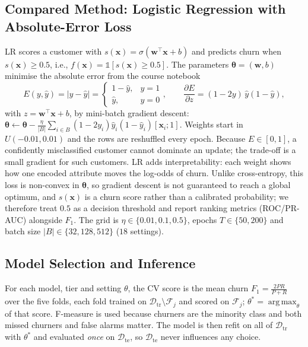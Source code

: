 \documentclass[sigconf,nonacm]{acmart}
\newcommand{\Dtr}{\mathcal{D}_{\mathrm{tr}}}
\newcommand{\Dte}{\mathcal{D}_{\mathrm{te}}}
\DeclareMathOperator*{\argmax}{arg\,max}
\begin{document}
\subsection{Compared Method: Logistic Regression with Absolute-Error Loss}
LR scores a customer with $s(\mathbf{x})=\sigma(\mathbf{w}^{\top}\mathbf{x}+b)$ and predicts churn when $s(\mathbf{x})\ge0.5$, i.e., $f(\mathbf{x})=\mathbb{1}[s(\mathbf{x})\ge0.5]$. The parameters $\boldsymbol\theta=(\mathbf{w},b)$ minimise the absolute error from the course notebook
\begin{equation*}
E(y,\hat y)=|y-\hat y|=\begin{cases}1-\hat y,&y=1\\ \hat y,&y=0\end{cases},\qquad \frac{\partial E}{\partial z}=(1-2y)\,\hat y(1-\hat y),
\end{equation*}
with $z=\mathbf{w}^{\top}\mathbf{x}+b$, by mini-batch gradient descent:
$\boldsymbol\theta\leftarrow\boldsymbol\theta-\frac{\eta}{|B|}\sum_{i\in B}(1-2y_i)\hat y_i(1-\hat y_i)[\mathbf{x}_i;1]$. Weights start in $U(-0.01,0.01)$ and the rows are reshuffled every epoch. Because $E\in[0,1]$, a confidently misclassified customer cannot dominate an update; the trade-off is a small gradient for such customers. LR adds interpretability: each weight shows how one encoded attribute moves the log-odds of churn. Unlike cross-entropy, this loss is non-convex in $\boldsymbol\theta$, so gradient descent is not guaranteed to reach a global optimum, and $s(\mathbf{x})$ is a churn score rather than a calibrated probability; we therefore treat $0.5$ as a decision threshold and report ranking metrics (ROC/PR-AUC) alongside $F_1$. The grid is $\eta\in\{0.01,0.1,0.5\}$, epochs $T\in\{50,200\}$ and batch size $|B|\in\{32,128,512\}$ ($18$ settings).

\subsection{Model Selection and Inference}
For each model, tier and setting $\theta$, the CV score is the mean churn $F_1=\frac{2PR}{P+R}$ over the five folds, each fold trained on $\Dtr\setminus\mathcal{F}_j$ and scored on $\mathcal{F}_j$; $\theta^*=\argmax_\theta$ of that score. F-measure is used because churners are the minority class and both missed churners and false alarms matter. The model is then refit on all of $\Dtr$ with $\theta^*$ and evaluated \emph{once} on $\Dte$, so $\Dte$ never influences any choice.
\end{document}
